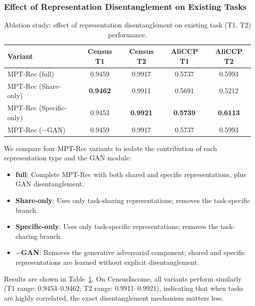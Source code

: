 \documentclass[review,anonymous]{acmart}
\begin{document}
\subsubsection{Effect of Representation Disentanglement on Existing Tasks}
\label{sec:ablation_existing}

\begin{table}[t]
  \centering
  \caption{Ablation study: effect of representation disentanglement on existing
           task (T1, T2) performance.}
  \label{tab:ablation_existing}
  \begin{tabular}{lcccc}
    \toprule
    \textbf{Variant} & \textbf{Census T1} & \textbf{Census T2} & \textbf{AliCCP T1} & \textbf{AliCCP T2} \\
    \midrule
    MPT-Rec (full)           & 0.9459 & 0.9917 & 0.5737 & 0.5993 \\
    MPT-Rec (Share-only)     & \textbf{0.9462} & 0.9911 & 0.5691 & 0.5212 \\
    MPT-Rec (Specific-only)  & 0.9453 & \textbf{0.9921} & \textbf{0.5739} & \textbf{0.6113} \\
    MPT-Rec ($-$GAN)         & 0.9459 & 0.9917 & 0.5737 & 0.5993 \\
    \bottomrule
  \end{tabular}
\end{table}

We compare four MPT-Rec variants to isolate the contribution of each
representation type and the GAN module:

\begin{itemize}
  \item \textbf{full}: Complete MPT-Rec with both shared and specific
    representations, plus GAN disentanglement.
  \item \textbf{Share-only}: Uses only task-sharing representations; removes
    the task-specific branch.
  \item \textbf{Specific-only}: Uses only task-specific representations; removes
    the task-sharing branch.
  \item \textbf{$-$GAN}: Removes the generative adversarial component; shared
    and specific representations are learned without explicit disentanglement.
\end{itemize}

Results are shown in Table~\ref{tab:ablation_existing}. On CensusIncome, all
variants perform similarly (T1 range: 0.9453--0.9462; T2 range:
0.9911--0.9921), indicating that when tasks are highly correlated, the exact
disentanglement mechanism matters less.
\end{document}
